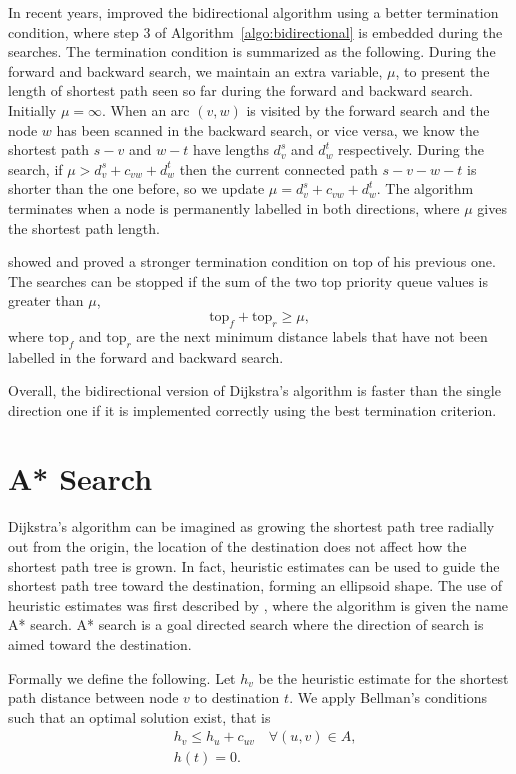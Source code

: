 In recent years,
\citet{Goldberg05} improved the bidirectional algorithm using a better termination condition,
where step 3 of Algorithm~\ref{algo:bidirectional} is embedded during the searches.
The termination condition is summarized as the following.
During the forward and backward search,
we maintain an extra variable, $\mu$, to present the length of shortest path seen so far during the forward and backward search.
Initially $\mu = \infty$.
When an arc $(v,w)$ is visited by the forward search and the node $w$ has been scanned in the backward search, or vice versa,
we know the shortest path $s-v$ and $w-t$ have lengths $d_v^s$ and $d_w^t$ respectively.
During the search, if $\mu > d_v^s + c_{vw} + d_w^t$ then the current connected path $s-v-w-t$ is shorter than the one before, 
so we update $\mu = d_v^s + c_{vw} + d_w^t$.
The algorithm terminates when a node is permanently labelled in both directions,
where $\mu$ gives the shortest path length.

\citet{GoldbergEPP} showed and proved a stronger termination condition on top of his previous one.
The searches can be stopped if the sum of the two top priority queue values is greater than $\mu$,
\[
    \text{top}_f + \text{top}_r \geq \mu,
\]
where $\text{top}_f$ and $\text{top}_r$ are the next minimum distance labels that have not been labelled in the forward and backward search.

Overall, the bidirectional version of Dijkstra's algorithm is faster than the single direction one if it is implemented correctly using the best termination criterion.

\section{A* Search}\label{section:A*}
Dijkstra's algorithm can be imagined as growing the shortest path tree radially out from the origin,
the location of the destination does not affect how the shortest path tree is grown.
In fact, heuristic estimates can be used to guide the shortest path tree toward the destination,
forming an ellipsoid shape.
The use of heuristic estimates was first described by \citet{Astar},
where the algorithm is given the name A* search.
A* search is a goal directed search where the direction of search is aimed toward the destination.


Formally we define the following.
Let $h_v$ be the heuristic estimate for the shortest path distance between node $v$ to destination $t$.
We apply Bellman's conditions such that an optimal solution exist, that is 
\begin{align}
    &h_v \leq h_u + c_{uv} \quad \forall(u,v) \in A, \label{eq:A*1}\\
    &h(t) = 0. \label{eq:A*2}
\end{align}

